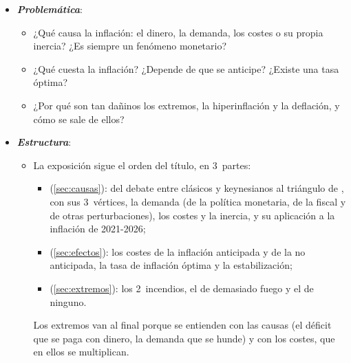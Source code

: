 \documentclass[11pt]{article}
\begin{document}
\begin{itemize}
\begin{itemize}
\begin{enumerate}
    \end{enumerate}
  \item \emph{Consenso y debate}:
    \begin{itemize}
    \item hay \emph{consenso} en 2~cosas: a largo plazo la inflación sigue al dinero, y una inflación alta y volátil es mala para la eficiencia, el bienestar y la estabilidad;
    \item el \emph{debate} está en qué la mueve a corto plazo y por qué persiste (para los modelos neoclásicos, la inflación desaparece al retirar el estímulo; para los keynesianos, las rigideces la mantienen), y en qué objetivo conviene: la regla de  pide una deflación suave; las rigideces nominales, inflación nula; el límite inferior de los tipos y la rigidez de los salarios a la baja, algo positiva.
    \end{itemize}
  \end{itemize}

\item \textbf{\emph{Problemática}}:
  \begin{itemize}
  \item ¿Qué causa la inflación: el dinero, la demanda, los costes o su propia inercia? ¿Es siempre un fenómeno monetario?
  \item ¿Qué cuesta la inflación? ¿Depende de que se anticipe? ¿Existe una tasa óptima?
  \item ¿Por qué son tan dañinos los extremos, la hiperinflación y la deflación, y cómo se sale de ellos?
  \end{itemize}

\item \textbf{\emph{Estructura}}:
  \begin{itemize}
  \item La exposición sigue el orden del título, en 3~partes:
  \begin{itemize}
  \item {} (\ref{sec:causas}): del debate entre clásicos y keynesianos al triángulo de , con sus 3~vértices, la demanda (de la política monetaria, de la fiscal y de otras perturbaciones), los costes y la inercia, y su aplicación a la inflación de 2021-2026;
  \item {} (\ref{sec:efectos}): los costes de la inflación anticipada y de la no anticipada, la tasa de inflación óptima y la estabilización;
  \item {} (\ref{sec:extremos}): los 2~incendios, el de demasiado fuego y el de ninguno.
  \end{itemize}
  Los extremos van al final porque se entienden con las causas (el déficit que se paga con dinero, la demanda que se hunde) y con los costes, que en ellos se multiplican.
  \end{itemize}
\end{itemize}
\end{document}
